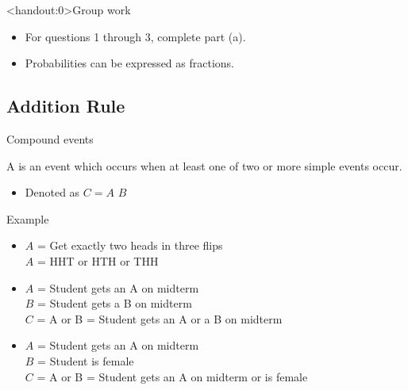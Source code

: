 \documentclass[xcolor=table, aspectratio=169, bigger, handout]{beamer}
\begin{document}
\begin{frame}<handout:0>{Group work}
\begin{block}{}
\large
\begin{itemize}
\item For questions 1 through 3, complete part (a).
\item Probabilities can be expressed as fractions.
\end{itemize}
\end{block}
\end{frame}

%
%
\subsection{Addition Rule}

\begin{frame}{Compound events}
\begin{block}{}
A  is an event which occurs when at least one of two or more simple events occur.
\begin{itemize}
\pause
\item Denoted as $C = A$  $B$
\end{itemize}
\end{block}

\pause
\begin{exampleblock}{Example}
\begin{itemize}
\item $A$ = Get exactly two heads in three flips\\
$A$ = HHT or HTH or THH

\pause
\item $A$ = Student gets an A on midterm\\
$B$ = Student gets a B on midterm\\
$C$ = A or B = Student gets an A or a B on midterm

\pause
\item $A$ = Student gets an A on midterm\\
$B$ = Student is female\\
$C$ = A or B = Student gets an A on midterm or is female
\end{itemize}
\end{exampleblock}
\end{frame}
\end{document}
